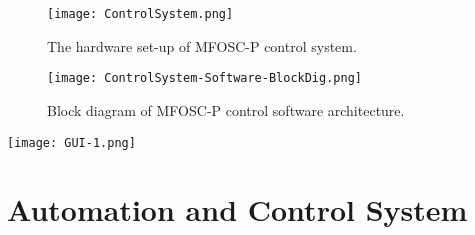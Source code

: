\begin{figure}
	\centering
	\texttt{[image: ControlSystem.png]}
	\vspace{0.2cm}
	\caption{The hardware set-up of MFOSC-P control system.}
	\label{fig-ControlSystem}
\end{figure}


\begin{figure}
	\centering
	\texttt{[image: ControlSystem-Software-BlockDig.png]}
	\vspace{0.2cm}
	\caption{Block diagram of MFOSC-P control software architecture.}
	\label{fig-ControlSys-Software}
\end{figure}


\begin{figure*}	
	\centering
	\texttt{[image: GUI-1.png]}
	\vspace{0.2cm}
	\caption{The graphical user interface (GUI) for MFOSC-P. The GUI has been developed using Python-PyQT framework and acts as the font end of MFOSC-P control software. See section~\ref{sec-ControlSys} for details.}
	\label{fig-GUI}
\end{figure*}


\par 
\section{Automation and Control System}
\label{sec-ControlSys}
\par 


